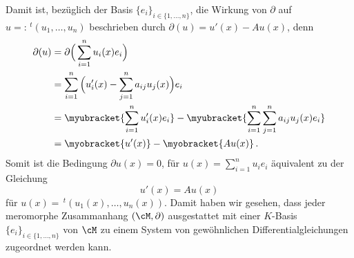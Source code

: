 Damit ist, bezüglich der Basis $\{e_i\}_{i\in\{1,\dots,n\}}$, die Wirkung von
$\partial$ auf $u=:\,^t(u_1,\dots,u_n)$ beschrieben durch
$\partial(u)=u'(x) - Au(x)$, denn
\begin{align*}
\partial(u) &= \partial \Big( \sum_{i=1}^nu_i(x)e_i \Big)
\\&=\sum_{i=1}^n \Big( u_i'(x)-\sum_{j=1}^na_{ij}u_j(x) \Big)e_i
\\&=\myubracket{\sum_{i=1}^n u_i'(x)e_i}
  - \myubracket{\sum_{i=1}^n\sum_{j=1}^na_{ij}u_j(x)e_i}
\\&=\myobracket{u'(x)} - \myobracket{Au(x)} \,.
\end{align*}
Somit ist die Bedingung $\partial u(x)=0$, für $u(x)= \sum_{i=1}^n u_ie_i$
äquivalent zu der Gleichung
\begin{equation*}
u'(x)=Au(x)
\end{equation*}
für $u(x)=\,^t(u_1(x),\dots,u_n(x))$. Damit haben wir gesehen,
dass jeder meromorphe Zusammanhang $(\cM,\partial)$ ausgestattet mit einer
$K$-Basis $\{e_i\}_{i\in\{1,\dots,n\}}$ von $\cM$ zu einem System von
gewöhnlichen Differentialgleichungen zugeordnet werden kann.

\begin{comment}
\begin{prop}[Transformationsformel] \cite[Chap 5.1.1]{hotta2007d}
In der Situation
\begin{center}
\begin{tikzpicture} [scale=3.3, descr/.style={fill=white,inner sep=2.5pt} ]
\matrix (m) [
  matrix of math nodes
  , row sep=3em
  , column sep=3em
]
{
  K^r &   &   & K^r \\
      & M & M & \\
  K^r &   &   & K^r \\
};
\path[->,font=\scriptsize,>=angle 90]
(m-1-1) edge node[descr]{$\cong$} node[above]{$\phi$} (m-2-2)
(m-3-1) edge node[descr]{$\cong$} node[above]{$\psi$} (m-2-2)
(m-1-4) edge node[descr]{$\cong$} node[above]{$\phi$} (m-2-3)
(m-3-4) edge node[descr]{$\cong$} node[above]{$\psi$} (m-2-3)

(m-2-2) edge node[above]{$\partial$} (m-2-3)

(m-1-1) edge node[above]{$\frac{d}{dz}+A$} (m-1-4)
(m-3-1) edge node[above]{$\frac{d}{dz}+B$} (m-3-4)

(m-3-1) edge node[descr]{$\cong$} node[right]{$T$} (m-1-1)
(m-3-4) edge node[descr]{$\cong$} node[left]{$T$} (m-1-4)
;

\path[>=stealth,|->]
;
\end{tikzpicture}
\end{center}
mit $\phi,\psi$ und $T$ $K$-Linear und $\partial,(\frac{d}{dx}+A)$ und
$(\frac{d}{dx}+B)$ $\C$-Linear, gilt:\\
Der meromorphe Zusammenhang. $\frac{d}{dx}+A$ auf $K^r$ wird durch
Basiswechsel
$T\in GL(r,K)$ zu
\[
\frac{d}{dx}+(T^{-1}\cdot T'+T^{-1}AT) = \frac{d}{dx}+B
\]
\end{prop}
\end{comment}

